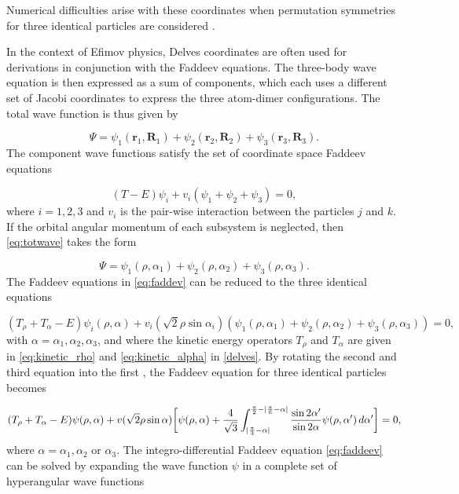 Numerical difficulties arise with these coordinates when permutation symmetries for three identical particles are considered \cite{rimondo_berman_lin}. 

In the context of Efimov physics, Delves coordinates are often used for derivations in conjunction with the Faddeev equations. The three-body wave equation is then expressed as a sum of components, which each uses a different set of Jacobi coordinates to express the three atom-dimer configurations.  The total wave function is thus given by

\begin{equation}\label{eq:totwave}
\Psi = \psi_{1}(\mathbf{r}_1,\mathbf{R}_1)+\psi_{2}(\mathbf{r}_2,\mathbf{R}_2)+\psi_{3}(\mathbf{r}_3,\mathbf{R}_3).
\end{equation}
The component wave functions satisfy the set of coordinate space Faddeev equations

\begin{equation}\label{eq:faddev}
(T-E)\psi_{i} + v_i(\psi_{1}+\psi_{2}+\psi_{3}) = 0,
\end{equation}
where $i = 1,2,3$ and $v_i$ is the pair-wise interaction between the particles $j$ and $k$. If the orbital angular momentum of each subsystem is neglected, then \eqref{eq:totwave} takes the form 

\begin{equation}
\Psi = \psi_{1}(\rho,\alpha_1)+\psi_{2}(\rho,\alpha_2)+\psi_{3}(\rho,\alpha_3).
\end{equation}
The Faddeev equations in \eqref{eq:faddev} can be reduced to the three identical equations

\begin{equation}
(T_{\rho} + T_{\alpha} -E)\psi_{i}(\rho,\alpha) + v_i(\sqrt{2}\rho\sin \alpha_i)(\psi_{1}(\rho,\alpha_1)+\psi_{2}(\rho,\alpha_2)+\psi_{3}(\rho,\alpha_3)) = 0,
\end{equation}
with $\alpha = \alpha_1,\alpha_2,\alpha_3$, and where the kinetic energy operators $T_{\rho}$ and $T_{\alpha}$ are given in \eqref{eq:kinetic_rho} and \eqref{eq:kinetic_alpha} in \cref{delves}. By rotating the second and third equation into the first \cite{Fedorov1993}, the Faddeev equation for three identical particles becomes

\begin{equation}\label{eq:faddeev}
(T_{\rho} + T_{\alpha} -E)\psi(\rho,\alpha) + v(\sqrt{2}\rho\sin \alpha)\bigg[\psi(\rho,\alpha) + \frac{4}{\sqrt{3}} \int_{\lvert\frac{\pi}{3}-\alpha\rvert}^{\frac{\pi}{2}-\lvert\frac{\pi}{6}-\alpha\rvert} \frac{\sin 2\alpha'}{\sin 2\alpha}\psi(\rho,\alpha') \, d\alpha'\bigg] = 0,
\end{equation} 
where $\alpha = \alpha_1, \alpha_2$ or $\alpha_3$. The integro-differential Faddeev equation \eqref{eq:faddeev} can be solved by expanding the wave function $\psi$ in a complete set of hyperangular wave functions

